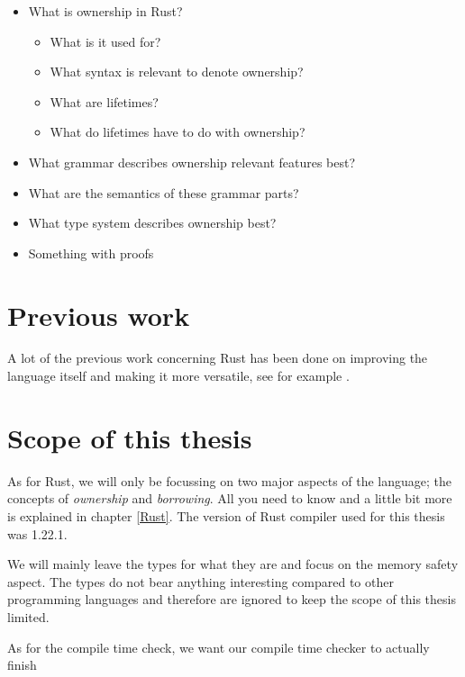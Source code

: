\begin{itemize}[noitemsep]
    \item What is ownership in Rust?
    \begin{itemize}[noitemsep]
        \item What is it used for?
        \item What syntax is relevant to denote ownership?
        \item What are lifetimes?
        \item What do lifetimes have to do with ownership?
    \end{itemize}
    \item What grammar describes ownership relevant features best?
    \item What are the semantics of these grammar parts?
    \item What type system describes ownership best?
    \item Something with proofs
\end{itemize}




\section{Previous work}
A lot of the previous work concerning Rust has been done on improving the language itself and making it more versatile, see for example \cite{jespersen2015session}.


\section{Scope of this thesis}
As for Rust, we will only be focussing on two major aspects of the language; the concepts of \emph{ownership} and \emph{borrowing}. All you need to know and a little bit more is explained in chapter \ref{Rust}. The version of Rust compiler used for this thesis was 1.22.1. 

We will mainly leave the types for what they are and focus on the memory safety aspect. The types do not bear anything interesting compared to other programming languages and therefore are ignored to keep the scope of this thesis limited. 

As for the compile time check, we want our compile time checker to actually finish 
